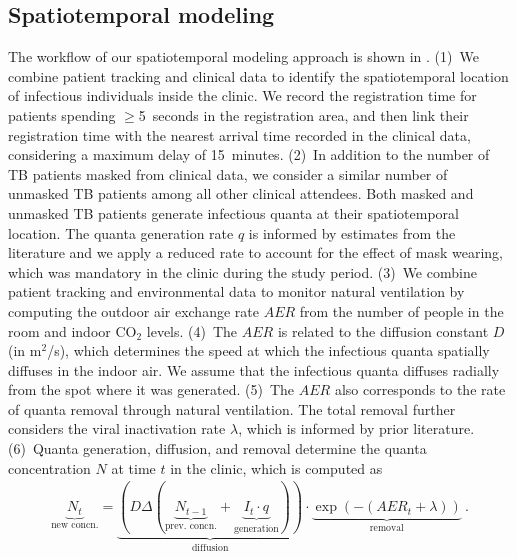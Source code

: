 \documentclass[fleqn,11pt]{wlscirep}
\begin{document}
\subsection{Spatiotemporal modeling}

The workflow of our spatiotemporal modeling approach is shown in . (1)~We combine patient tracking and clinical data to identify the spatiotemporal location of infectious individuals inside the clinic. We record the registration time for patients spending $\geq$5~seconds in the registration area, and then link their registration time with the nearest arrival time recorded in the clinical data, considering a maximum delay of 15~minutes. (2)~In addition to the number of TB patients masked from clinical data, we consider a similar number of unmasked TB patients among all other clinical attendees\cite{Berhanu2023CID}. Both masked and unmasked TB patients generate infectious quanta at their spatiotemporal location. The quanta generation rate $q$ is informed by estimates from the literature\cite{Andrews2014JID,Riley1962ARRD,Escombe2008PLoSMed,Nardell1991ARRD} and we apply a reduced rate to account for the effect of mask wearing\cite{Dharmadhikari2012AJRCCM}, which was mandatory in the clinic during the study period. (3)~We combine patient tracking and environmental data to monitor natural ventilation by computing the outdoor air exchange rate $AER$ from the number of people in the room and indoor CO$_2$ levels\cite{Batterman2017IJERPH}. (4)~The $AER$ is related to the diffusion constant $D$ (in m$^2$/s)\cite{Cheng2011EnvSciTech}, which determines the speed at which the infectious quanta spatially diffuses in the indoor air. We assume that the infectious quanta diffuses radially from the spot where it was generated. (5)~The $AER$ also corresponds to the rate of quanta removal through natural ventilation. The total removal further considers the viral inactivation rate $\lambda$, which is informed by prior literature\cite{Loudon1969AMRRD,Lever2000LettersAppliedMicrobio,Gannon2007ResVetSci,Klein2014IJMyco}. (6)~Quanta generation, diffusion, and removal determine the quanta concentration $N$ at time $t$ in the clinic, which is computed as 
\begin{align}\label{eq:spattemp-N}
    \underbrace{N_{t}}_{\text{new concn.}} = \underbrace{\left(D \Delta (\underbrace{N_{t-1}}_{\text{prev. concn.}} + \underbrace{I_t \cdot q}_{\text{generation}})\right)}_{\text{diffusion}} \cdot \underbrace{\exp\left(-(AER_t + \lambda)\right)}_{\text{removal}} ~.
\end{align}
\end{document}
